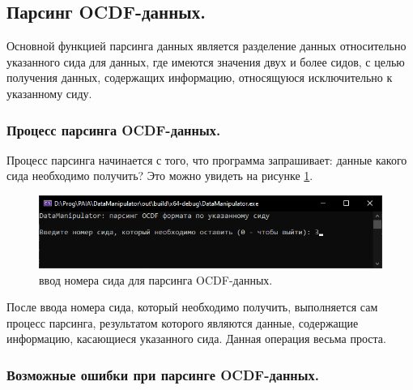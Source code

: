 \subsection{ \standartTitleFont
  Парсинг OCDF-данных. 
} \label{subsec:OCDFPars}

{\standartFont

  \par Основной функцией парсинга данных является разделение данных относительно указанного сида для данных, где имеются значения двух и более сидов, с целью получения данных, содержащих информацию, относящуюся исключительно к указанному сиду.

  \par 
}

\subsubsection{ \standartTitleFont
  Процесс парсинга OCDF-данных. 
} \label{subsubsec:OCDFParsProc}

{\standartFont

  \par Процесс парсинга начинается с того, что программа запрашивает: данные какого сида необходимо получить? Это можно увидеть на рисунке \ref{fig:OCDFdataParsSt}.

  \begin{figure}[H]
    \centering
    \includegraphics[width=\textwidth]{images/forDataManipulator/OCDFdataParcing.png}
    \caption{ввод номера сида для парсинга OCDF-данных.} 
    \label{fig:OCDFdataParsSt}
  \end{figure}

  \par После ввода номера сида, который необходимо получить, выполняется сам процесс парсинга, результатом которого являются данные, содержащие информацию, касающиеся указанного сида. Данная операция весьма проста.

  \par 
}

\subsubsection{ \standartTitleFont
  Возможные ошибки при парсинге OCDF-данных.
} \label{subsubsec:OCDFParsErr}

